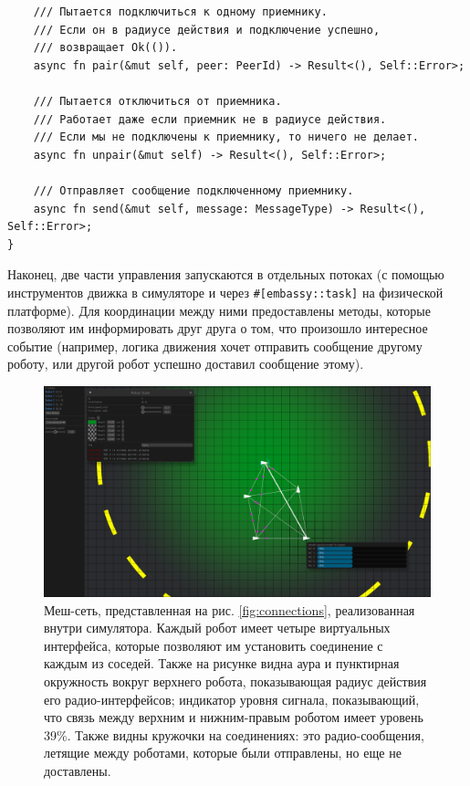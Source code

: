 \documentclass[%
]{article}
\begin{document}
\begin{listing}[h]
\begin{verbatim}
    /// Пытается подключиться к одному приемнику.
    /// Если он в радиусе действия и подключение успешно,
    /// возвращает Ok(()).
    async fn pair(&mut self, peer: PeerId) -> Result<(), Self::Error>;

    /// Пытается отключиться от приемника.
    /// Работает даже если приемник не в радиусе действия.
    /// Если мы не подключены к приемнику, то ничего не делает.
    async fn unpair(&mut self) -> Result<(), Self::Error>;

    /// Отправляет сообщение подключенному приемнику.
    async fn send(&mut self, message: MessageType) -> Result<(), Self::Error>;
}
\end{verbatim}
\end{listing}

Наконец, две части управления запускаются в отдельных потоках
(с помощью инструментов движка в симуляторе
и через \texttt{\#[embassy::task]} на физической платформе).
Для координации между ними предоставлены методы,
которые позволяют им информировать друг друга о том, что произошло интересное событие
(например, логика движения хочет
отправить сообщение другому роботу,
или другой робот успешно доставил сообщение этому).

\begin{figure}
  \centering
  \includegraphics[width=0.8\linewidth]{simulator-connections}
	\caption{Меш-сеть, представленная на рис. \ref{fig:connections}, реализованная внутри симулятора. Каждый робот имеет четыре виртуальных интерфейса, которые позволяют им установить соединение с каждым из соседей. Также на рисунке видна аура и пунктирная окружность вокруг верхнего робота, показывающая радиус действия его радио-интерфейсов; индикатор уровня сигнала, показывающий, что связь между верхним и нижним-правым роботом имеет уровень 39\%. Также видны кружочки на соединениях: это радио-сообщения, летящие между роботами, которые были отправлены, но еще не доставлены.}
  \label{fig:simulator-connections}
\end{figure}
\end{document}

